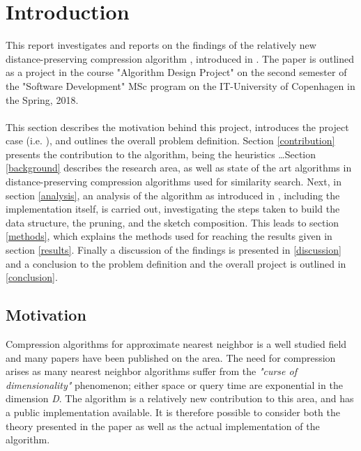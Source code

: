 \section{Introduction}
\label{introduction}
This report investigates and reports on the findings of the relatively new distance-preserving compression algorithm \qs{}, introduced in \cite{wagner17}. The paper is outlined as a project in the course "Algorithm Design Project" on the second semester of the "Software Development" MSc program on the IT-University of Copenhagen in the Spring, 2018.
\\
\\
This section describes the motivation behind this project, introduces the project case (i.e. \qs{}), and outlines the overall problem definition. Section \ref{contribution} presents the contribution to the algorithm, being the heuristics \dots Section \ref{background} describes the research area, as well as state of the art algorithms in distance-preserving compression algorithms used for similarity search. Next, in section \ref{analysis}, an analysis of the algorithm as introduced in \cite{wagner17}, including the \qs{} implementation itself, is carried out, investigating the steps taken to build the data structure, the pruning, and the sketch composition. This leads to section \ref{methods}, which explains the methods used for reaching the results given in section \ref{results}. Finally a discussion of the findings is presented in \ref{discussion} and a conclusion to the problem definition and the overall project is outlined in \ref{conclusion}.

\subsection{Motivation} %
Compression algorithms for approximate nearest neighbor is a well studied field and many papers have been published on the area. The need for compression arises as many nearest neighbor algorithms suffer from the \textit{"curse of dimensionality"} phenomenon; either space or query time are exponential in the dimension \textit{D}\cite{ilya15}. The \qs{} algorithm is a relatively new contribution to this area, and has a public implementation available. It is therefore possible to consider both the theory presented in the paper as well as the actual implementation of the algorithm. %
